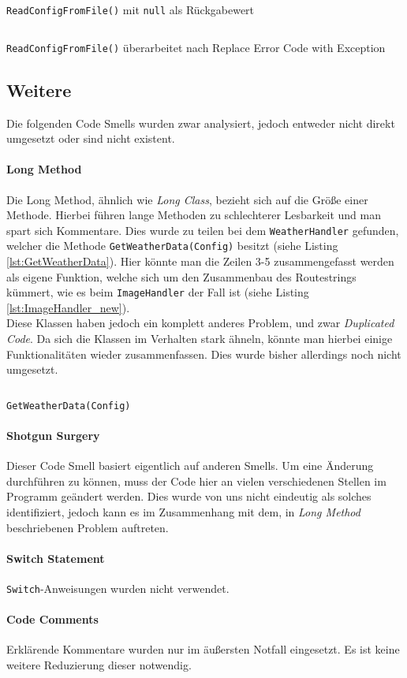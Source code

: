 \begin{listing}[h]
	\inputminted[linenos=true,frame=lines,breaklines, breaklines, breakbytokenanywhere]{csharp}{Listings/ReadConfigFromFile_old.cs}
	\caption{\texttt{ReadConfigFromFile()} mit \texttt{null} als Rückgabewert}
	\label{lst:ReadConfigFromFile_old}
\end{listing}

\begin{listing}[h]
	\inputminted[linenos=true,frame=lines,breaklines, breakbytokenanywhere]{csharp}{Listings/ReadConfigFromFile_new.cs}
	\caption{\texttt{ReadConfigFromFile()} überarbeitet nach Replace Error Code with Exception}
	\label{lst:ReadConfigFromFile_new}
\end{listing}

\subsection{Weitere}
Die folgenden Code Smells wurden zwar analysiert, jedoch entweder nicht direkt umgesetzt oder sind nicht existent.
\paragraph{Long Method}
Die Long Method, ähnlich wie \textit{Long Class}, bezieht sich auf die Größe einer Methode.
Hierbei führen lange Methoden zu schlechterer Lesbarkeit und man spart sich Kommentare.
Dies wurde zu teilen bei dem \texttt{WeatherHandler} gefunden, welcher die Methode \texttt{GetWeatherData(Config)} besitzt (siehe Listing \ref{lst:GetWeatherData}).
Hier könnte man die Zeilen 3-5 zusammengefasst werden als eigene Funktion, welche sich um den Zusammenbau des Routestrings kümmert, wie es beim \texttt{ImageHandler} der Fall ist (siehe Listing \ref{lst:ImageHandler_new}).\\

\noindent Diese Klassen haben jedoch ein komplett anderes Problem, und zwar \textit{Duplicated Code}. 
Da sich die Klassen im Verhalten stark ähneln, könnte man hierbei einige Funktionalitäten wieder zusammenfassen. Dies wurde bisher allerdings noch nicht umgesetzt.

\begin{listing}[h]
	\inputminted[linenos=true,frame=lines, breaklines, breakbytokenanywhere]{csharp}{Listings/GetWeatherData.cs}
	\caption{\texttt{GetWeatherData(Config)}}
	\label{lst:GetWeatherData}
\end{listing}
\paragraph{Shotgun Surgery}
Dieser Code Smell basiert eigentlich auf anderen Smells. 
Um eine Änderung durchführen zu können, muss der Code hier an vielen verschiedenen Stellen im Programm geändert werden.
Dies wurde von uns nicht eindeutig als solches identifiziert, jedoch kann es im Zusammenhang mit dem, in \textit{Long Method} beschriebenen Problem auftreten.
\paragraph{Switch Statement}
\texttt{Switch}-Anweisungen wurden nicht verwendet.
\paragraph{Code Comments}
Erklärende Kommentare wurden nur im äußersten Notfall eingesetzt.
Es ist keine weitere Reduzierung dieser notwendig.